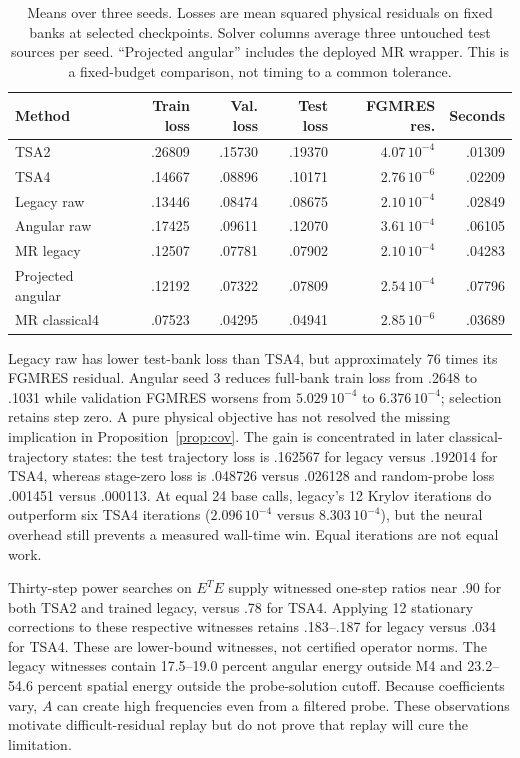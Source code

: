 \documentclass[11pt]{article}
\begin{document}
\begin{table}[ht]
\centering\small
\begin{tabular}{lrrrrr}
\toprule
Method & Train loss & Val. loss & Test loss & FGMRES res. & Seconds\\
\midrule
TSA2 & .26809 & .15730 & .19370 & $4.07\,10^{-4}$ & .01309\\
TSA4 & .14667 & .08896 & .10171 & $2.76\,10^{-6}$ & .02209\\
Legacy raw & .13446 & .08474 & .08675 & $2.10\,10^{-4}$ & .02849\\
Angular raw & .17425 & .09611 & .12070 & $3.61\,10^{-4}$ & .06105\\
MR legacy & .12507 & .07781 & .07902 & $2.10\,10^{-4}$ & .04283\\
Projected angular & .12192 & .07322 & .07809 & $2.54\,10^{-4}$ & .07796\\
MR classical4 & .07523 & .04295 & .04941 & $2.85\,10^{-6}$ & .03689\\
\bottomrule
\end{tabular}
\caption{Means over three seeds. Losses are mean squared physical residuals on
fixed banks at selected checkpoints. Solver columns average three untouched
test sources per seed. ``Projected angular'' includes the deployed MR wrapper.
This is a fixed-budget comparison, not timing to a common tolerance.}
\end{table}

Legacy raw has lower test-bank loss than TSA4, but approximately 76 times its
FGMRES residual. Angular seed 3 reduces full-bank train loss from .2648 to
.1031 while validation FGMRES worsens from $5.029\,10^{-4}$ to
$6.376\,10^{-4}$; selection retains step zero. A pure physical objective has
not resolved the missing implication in Proposition~\ref{prop:cov}.
The gain is concentrated in later classical-trajectory states: the test
trajectory loss is .162567 for legacy versus .192014 for TSA4, whereas stage-zero
loss is .048726 versus .026128 and random-probe loss .001451 versus .000113.
At equal 24 base calls, legacy's 12 Krylov iterations do outperform six TSA4
iterations ($2.096\,10^{-4}$ versus $8.303\,10^{-4}$), but the neural overhead
still prevents a measured wall-time win. Equal iterations are not equal work.

Thirty-step power searches on $E^TE$ supply witnessed one-step ratios near
.90 for both TSA2 and trained legacy, versus .78 for TSA4. Applying 12
stationary corrections to these respective witnesses retains .183--.187 for
legacy versus .034 for TSA4. These are lower-bound witnesses, not certified
operator norms. The legacy witnesses contain 17.5--19.0 percent angular energy
outside M4 and 23.2--54.6 percent spatial energy outside the probe-solution
cutoff. Because coefficients vary, $A$ can create high frequencies even from a
filtered probe. These observations motivate difficult-residual replay but do
not prove that replay will cure the limitation.
\end{document}
